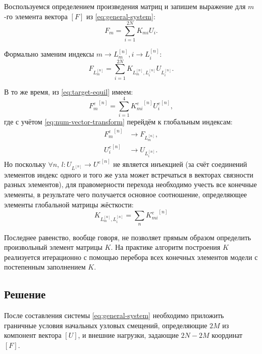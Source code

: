 \documentclass[10pt]{article}
\numberwithin{equation}{section}
\newcommand{\matr}[1]{[#1]}
\begin{document}
Воспользуемся определением произведения матриц и запишем выражение для
$m$-го элемента вектора $\matr{F}$ из \eqref{eq:general-system}:
\begin{equation*}
  F_m = \sum_{i=1}^{2N}{K_{mi}U_i}.
\end{equation*}

Формально заменим индексы $m \to L_m^{[n]}, i \to L_i^{[n]}$:
\begin{equation}
  F_{L_m^{[n]}} = \sum_{i=1}^{2N}{K_{{L_m^{[n]}},{L_i^{[n]}}}{U_{L_i^{[n]}}}}.
\end{equation}

В то же время, из \eqref{eq:target-equil} имеем:
\begin{equation}
  \label{eq:target-equil-prod}
  {F_m^e}^{[n]} = \sum_{i=1}^4{{K_{mi}^e}^{[n]}{U_i^e}^{[n]}},
\end{equation}
где с учётом \eqref{eq:num-vector-transform} перейдём к глобальным
индексам:
\begin{align*}
  {F_m^e}^{[n]} &\to F_{L_m^{[n]}},\\
  {U_i^e}^{[n]} &\to U_{L_i^{[n]}}.
\end{align*}
Но поскольку $\forall n$, $l\colon U_{L^{[n]}} \to {U^e}^{[n]}$ не
является инъекцией (за счёт соединений элементов индекс одного и того
же узла может встречаться в векторах связности разных элементов), для
правомерности перехода необходимо учесть все конечные элементы, в
результате чего получается основное соотношение, определяющее элементы
глобальной матрицы жёсткости:
\begin{equation}
  \label{eq:global-stiffness}
  K_{L_m^{[n]},{L_i^{[n]}}} = \sum_n{{K_{mi}^e}^{[n]}}
\end{equation}

Последнее равенство, вообще говоря, не позволяет прямым образом
определить произвольный элемент матрицы $K$. На практике алгоритм
построения $K$ реализуется итерационно с помощью перебора всех
конечных элементов модели с постепенным заполнением $K$.

\clearpage
\subsection{Решение}

После составления системы \eqref{eq:general-system} необходимо
приложить граничные условия начальных узловых смещений, определяющие
$2M$ из компонент вектора $\matr{U}$, и внешние нагрузки, задающие
$2N-2M$ координат $\matr{F}$.
\end{document}
